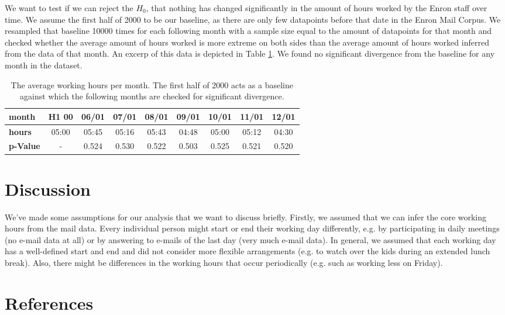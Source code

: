 \documentclass{article}
\begin{document}
We want to test if we can reject the $H_0$, that nothing has changed
significantly in the amount of hours worked by the Enron staff over time. We assume the
first half of 2000 to be our baseline, as there are only few datapoints before
that date in the Enron Mail Corpus. We resampled that baseline 10000 times for
each following month with a sample size equal to the amount of datapoints for
that month and checked whether the average amount of hours worked is more
extreme on both sides than the average amount of hours worked inferred from the
data of that month. An excerp of this data is depicted in Table
\ref{ta:pvalues}. We found no significant divergence from the baseline for any
month in the dataset.

\begin{table}
  \centering
  \begin{tabular}{|l|c|c|c|c|c|c|c|c|}
    \hline
    \textbf{month} & H1 00 & 06/01 & 07/01 & 08/01 & 09/01 & 10/01 & 11/01 &
    12/01 \\
    \hline
    \textbf{hours} & 05:00 & 05:45 & 05:16 & 05:43 & 04:48 & 05:00 & 05:12 &
    04:30 \\
    \hline
    \textbf{p-Value} & - & 0.524 & 0.530 & 0.522 & 0.503 & 0.525 & 0.521 & 0.520
    \\
    \hline
  \end{tabular}
  \caption{The average working hours per month. The first half of 2000 acts as a
  baseline against which the following months are checked for significant
  divergence.}
  \label{ta:pvalues}
\end{table}

\section{Discussion}
We've made some assumptions for our analysis that we want to discuss briefly. 
Firstly, we assumed that we can infer the core working hours from the mail data.
Every individual person might start or end their working day differently, e.g.
by participating in daily meetings (no e-mail data at all) or by answering to
e-mails of the last day (very much e-mail data). In general, we assumed that
each working day has a well-defined start and end and did not consider more
flexible arrangements (e.g. to watch over the kids during an extended lunch
break). Also, there might be differences in the working hours that occur
periodically (e.g. such as working less on Friday).

\section{References}


\end{document}
